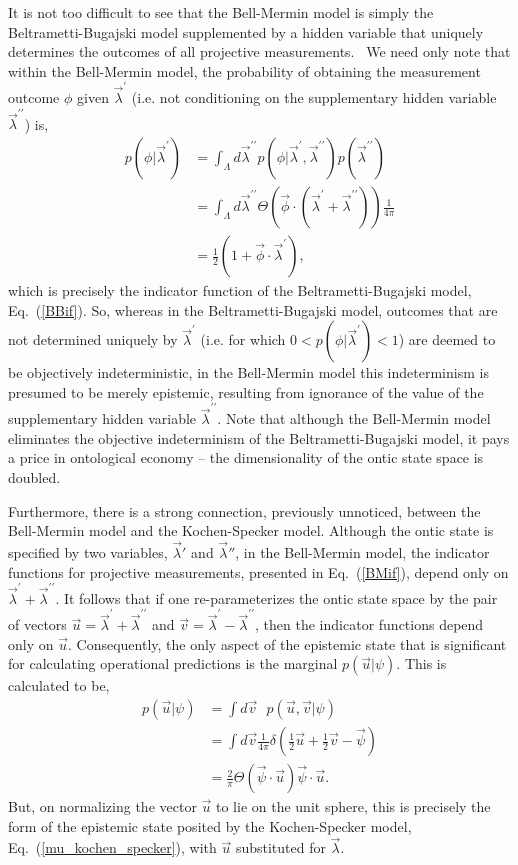 \documentclass[aps,nofootinbib,12pt]{revtex4-2}
\begin{document}
It is not too difficult to see that the Bell-Mermin model is simply
the Beltrametti-Bugajski model supplemented by a hidden variable
that uniquely determines the outcomes of all projective
measurements. \ We need only note that within the Bell-Mermin model,
the probability of obtaining the measurement outcome $\phi$ given
$\vec{\lambda}^{\prime}$ (i.e. not conditioning on the supplementary
hidden variable $\vec{\lambda}^{\prime\prime }$) is,
\begin{align*}
p(\phi|\vec{\lambda}^{\prime})  &
=\int_{\Lambda}d\vec{\lambda}^{\prime\prime
}p(\phi|\vec{\lambda}^{\prime},\vec{\lambda}^{\prime\prime})p(\vec{\lambda
}^{\prime\prime})\\
& =\int_{\Lambda}d\vec{\lambda}^{\prime\prime}\Theta(\vec{\phi}\cdot
(\vec{\lambda}^{\prime}+\vec{\lambda}^{\prime\prime}))\frac{1}{4\pi}\\
& =\frac{1}{2}\left(  1+\vec{\phi}\cdot\vec{\lambda}^{\prime}\right)
,
\end{align*}
which is precisely the indicator function of the
Beltrametti-Bugajski model, Eq.~(\ref{BBif}). So, whereas in the
Beltrametti-Bugajski model, outcomes that are not determined
uniquely by $\vec{\lambda}^{\prime}$ (i.e. for which $0<p(\phi
|\vec{\lambda}^{\prime})<1$) are deemed to be objectively
indeterministic, in the Bell-Mermin model this indeterminism is
presumed to be merely epistemic, resulting from ignorance of the
value of the supplementary hidden variable $\vec{\lambda
}^{\prime\prime}.$ Note that although the Bell-Mermin model
eliminates the objective indeterminism of the Beltrametti-Bugajski
model, it pays a price in ontological economy -- the dimensionality
of the ontic state space is doubled.

Furthermore, there is a strong connection, previously unnoticed,
between the Bell-Mermin model and the Kochen-Specker model. Although
the ontic state is specified by two variables, $\vec{\lambda}'$ and
$\vec{\lambda}''$, in the Bell-Mermin model, the indicator functions
for projective measurements, presented in Eq.~(\ref{BMif}), depend
only on $\vec{\lambda}^{\prime}+\vec{\lambda }^{\prime\prime}$. It
follows that if one re-parameterizes the ontic state space by the
pair of vectors
$\vec{u}=\vec{\lambda}^{\prime}+\vec{\lambda}^{\prime\prime}$ and
$\vec{v}=\vec{\lambda}^{\prime}-\vec{\lambda}^{\prime\prime}$, then
the indicator functions depend only on $\vec{u}$. Consequently, the
only aspect of the epistemic state that is significant for
calculating operational predictions is the marginal
$p(\vec{u}|\psi)$. This is calculated to be,
\begin{align}
p(\vec{u}|\psi)  & =\int d\vec{v}\text{ }p(\vec{u},\vec{v}|\psi)\\
\nonumber & =\int
d\vec{v}\frac{1}{4\pi}\delta(\frac{1}{2}\vec{u}+\frac{1}{2}\vec
{v}-\vec{\psi})\\ \nonumber
&=\frac{2}{\pi}\Theta(\vec{\psi}\cdot\vec{u})\text{
}\vec{\psi}\cdot\vec{u}.
\end{align}
But, on normalizing the vector $\vec{u}$ to lie on the unit sphere,
this is precisely the form of the epistemic state posited by the
Kochen-Specker model, Eq.~(\ref{mu_kochen_specker}), with $\vec{u}$
substituted for $\vec{\lambda}$.
\end{document}
